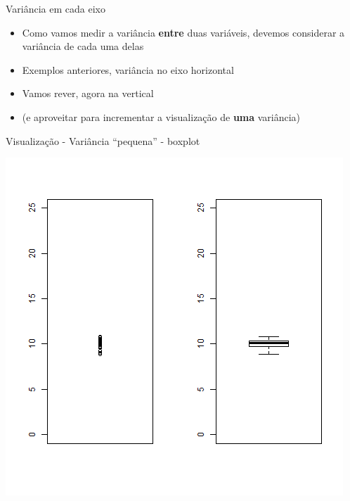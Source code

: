 \documentclass{beamer}
\begin{document}
\begin{frame}{Variância em cada eixo}
  \begin{itemize}
  \item Como vamos medir a variância {\bf entre} duas variáveis, devemos considerar a variância de cada uma delas
  \item Exemplos anteriores, variância no eixo horizontal
  \item Vamos rever, agora na vertical
  \item (e aproveitar para incrementar a visualização de {\bf uma} variância)
  \end{itemize}
\end{frame}

\begin{frame}{Visualização - Variância ``pequena'' - boxplot}
  \begin{center}
    \includegraphics[height=.8\textheight]{Cap17/dot-box-P}
  \end{center}
\end{frame}
\end{document}
